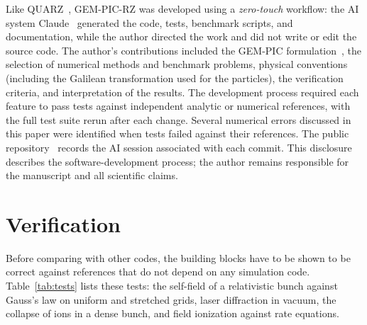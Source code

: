\documentclass[preprint,12pt]{elsarticle}
\begin{document}
Like QUARZ~\cite{QUARZ}, GEM-PIC-RZ was developed using a \emph{zero-touch} workflow: the AI system Claude~\cite{Claude} generated the code, tests, benchmark scripts, and documentation, while the author directed the work and did not write or edit the source code. The author's contributions included the GEM-PIC formulation~\cite{GEMPIC}, the selection of numerical methods and benchmark problems, physical conventions (including the Galilean transformation used for the particles), the verification criteria, and interpretation of the results. The development process required each feature to pass tests against independent analytic or numerical references, with the full test suite rerun after each change. Several numerical errors discussed in this paper were identified when tests failed against their references. The public repository~\cite{GEMPICRZ} records the AI session associated with each commit. This disclosure describes the software-development process; the author remains responsible for the manuscript and all scientific claims.

\section{Verification}\label{sec:valid}

Before comparing with other codes, the building blocks have to be shown to be correct against references that do not depend on any simulation code. Table~\ref{tab:tests} lists these tests: the self-field of a relativistic bunch against Gauss's law on uniform and stretched grids, laser diffraction in vacuum, the collapse of ions in a dense bunch, and field ionization against rate equations.
\end{document}
